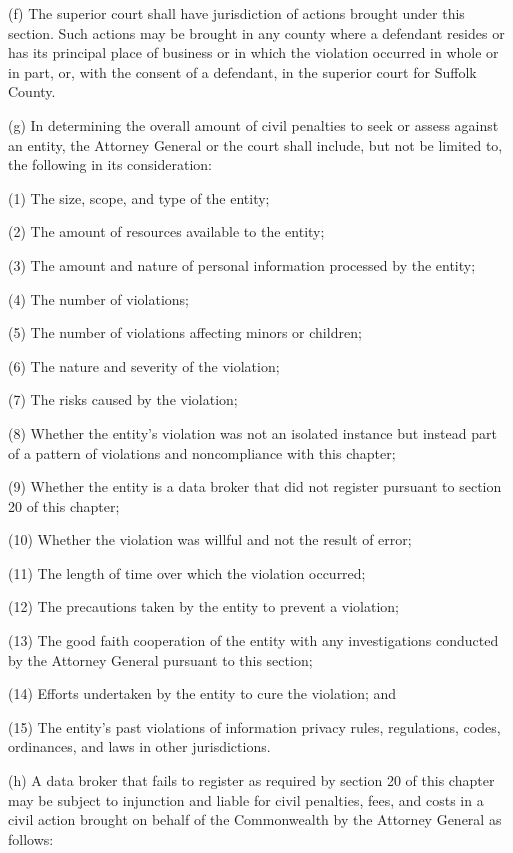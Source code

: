 (f) The superior court shall have jurisdiction of actions brought under this section. Such actions may be brought in any county where a defendant resides or has its principal place of business or in which the violation occurred in whole or in part, or, with the consent of a defendant, in the superior court for Suffolk County.

(g) In determining the overall amount of civil penalties to seek or assess against an entity, the Attorney General or the court shall include, but not be limited to, the following in its consideration:

(1) The size, scope, and type of the entity;

(2) The amount of resources available to the entity;

(3) The amount and nature of personal information processed by the entity;

(4) The number of violations;

(5) The number of violations affecting minors or children; 

(6) The nature and severity of the violation; 

(7) The risks caused by the violation;

(8) Whether the entity’s violation was not an isolated instance but instead part of a pattern of violations and noncompliance with this chapter;

(9) Whether the entity is a data broker that did not register pursuant to section 20 of this chapter;

(10) Whether the violation was willful and not the result of error;

(11) The length of time over which the violation occurred; 

(12) The precautions taken by the entity to prevent a violation;

(13) The good faith cooperation of the entity with any investigations conducted by the Attorney General pursuant to this section;

(14) Efforts undertaken by the entity to cure the violation; and   

(15) The entity’s past violations of information privacy rules, regulations, codes, ordinances, and laws in other jurisdictions.

(h) A data broker that fails to register as required by section 20 of this chapter may be subject to injunction and liable for civil penalties, fees, and costs in a civil action brought on behalf of the Commonwealth by the Attorney General as follows:

